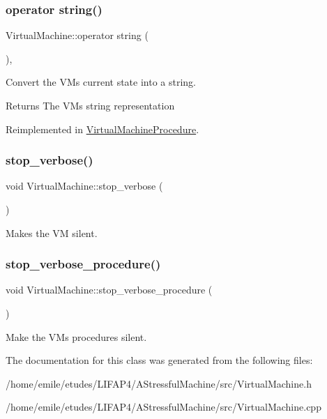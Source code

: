 \subsubsection{\texorpdfstring{operator string()}{operator string()}}
{\footnotesize\ttfamily Virtual\+Machine\+::operator string (\begin{DoxyParamCaption}{ }\end{DoxyParamCaption})\hspace{0.3cm}{\ttfamily [explicit]}, {\ttfamily [virtual]}}

Convert the VM\textquotesingle{}s current state into a string. \begin{DoxyReturn}{Returns}
The VM\textquotesingle{}s string representation 
\end{DoxyReturn}


Reimplemented in \hyperlink{classVirtualMachineProcedure_aea6310148a612586e5fd9e30650decb6}{Virtual\+Machine\+Procedure}.

\mbox{\label{classVirtualMachine_af80080c053a7f4b6c9f53444a4ce2244}} 
\subsubsection{\texorpdfstring{stop\+\_\+verbose()}{stop\_verbose()}}
{\footnotesize\ttfamily void Virtual\+Machine\+::stop\+\_\+verbose (\begin{DoxyParamCaption}{ }\end{DoxyParamCaption})}

Makes the VM silent. \mbox{\label{classVirtualMachine_a5eac3ead95ba1cb818c0634bd758cfc2}} 
\subsubsection{\texorpdfstring{stop\+\_\+verbose\+\_\+procedure()}{stop\_verbose\_procedure()}}
{\footnotesize\ttfamily void Virtual\+Machine\+::stop\+\_\+verbose\+\_\+procedure (\begin{DoxyParamCaption}{ }\end{DoxyParamCaption})}

Make the VM\textquotesingle{}s procedures silent. 

The documentation for this class was generated from the following files\+:\begin{DoxyCompactItemize}
\item 
/home/emile/etudes/\+L\+I\+F\+A\+P4/\+A\+Stressful\+Machine/src/Virtual\+Machine.\+h\item 
/home/emile/etudes/\+L\+I\+F\+A\+P4/\+A\+Stressful\+Machine/src/Virtual\+Machine.\+cpp\end{DoxyCompactItemize}
